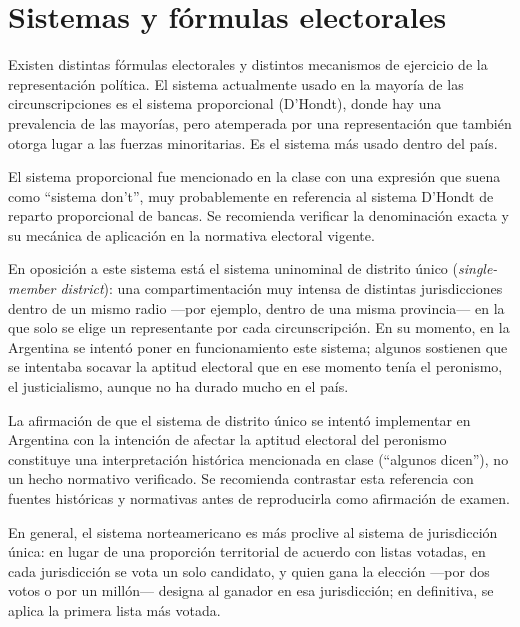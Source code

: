 \documentclass[12pt,oneside]{book}
\begin{document}
\section{Sistemas y fórmulas electorales}

Existen distintas fórmulas electorales y distintos mecanismos de ejercicio de la representación política. El sistema actualmente usado en la mayoría de las circunscripciones es el sistema proporcional (D'Hondt), donde hay una prevalencia de las mayorías, pero atemperada por una representación que también otorga lugar a las fuerzas minoritarias. Es el sistema más usado dentro del país.

\begin{important}
El sistema proporcional fue mencionado en la clase con una expresión que suena como ``sistema don't'', muy probablemente en referencia al sistema D'Hondt de reparto proporcional de bancas. Se recomienda verificar la denominación exacta y su mecánica de aplicación en la normativa electoral vigente.
\end{important}

En oposición a este sistema está el sistema uninominal de distrito único (\textit{single-member district}): una compartimentación muy intensa de distintas jurisdicciones dentro de un mismo radio —por ejemplo, dentro de una misma provincia— en la que solo se elige un representante por cada circunscripción. En su momento, en la Argentina se intentó poner en funcionamiento este sistema; algunos sostienen que se intentaba socavar la aptitud electoral que en ese momento tenía el peronismo, el justicialismo, aunque no ha durado mucho en el país.

\begin{important}
La afirmación de que el sistema de distrito único se intentó implementar en Argentina con la intención de afectar la aptitud electoral del peronismo constituye una interpretación histórica mencionada en clase (``algunos dicen''), no un hecho normativo verificado. Se recomienda contrastar esta referencia con fuentes históricas y normativas antes de reproducirla como afirmación de examen.
\end{important}

En general, el sistema norteamericano es más proclive al sistema de jurisdicción única: en lugar de una proporción territorial de acuerdo con listas votadas, en cada jurisdicción se vota un solo candidato, y quien gana la elección —por dos votos o por un millón— designa al ganador en esa jurisdicción; en definitiva, se aplica la primera lista más votada.
\end{document}
